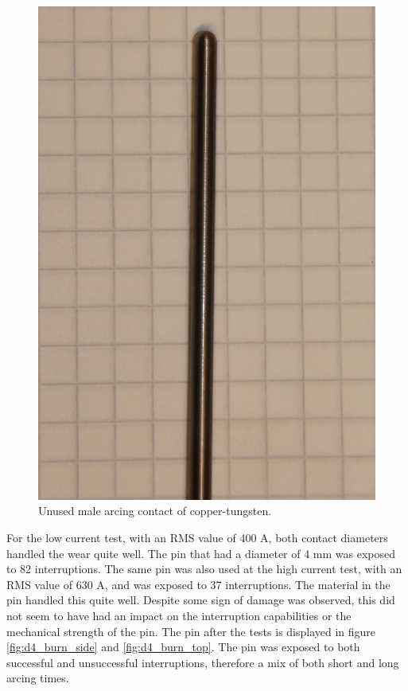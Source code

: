 \documentclass[10pt,a4paper,twoside]{article}
\begin{document}
\begin{figure}[H]
\centering
\includegraphics[scale=0.3]{Bilder/Discussion/d3_unused.png}
\caption{Unused male arcing contact of copper-tungsten.} \label{fig:unused_d3}
\end{figure}

For the low current test, with an RMS value of 400 A, both contact diameters handled the wear quite well. The pin that had a diameter of 4 mm was exposed to 82 interruptions. The same pin was also used at the high current test, with an RMS value of 630 A, and was exposed to 37 interruptions. The material in the pin handled this quite well. Despite some sign of damage was observed, this did not seem to have had an impact on the interruption capabilities or the mechanical strength of the pin. The pin after the tests is displayed in figure \ref{fig:d4_burn_side} and \ref{fig:d4_burn_top}. The pin was exposed to both successful and unsuccessful interruptions, therefore a mix of both short and long arcing times.
\end{document}
